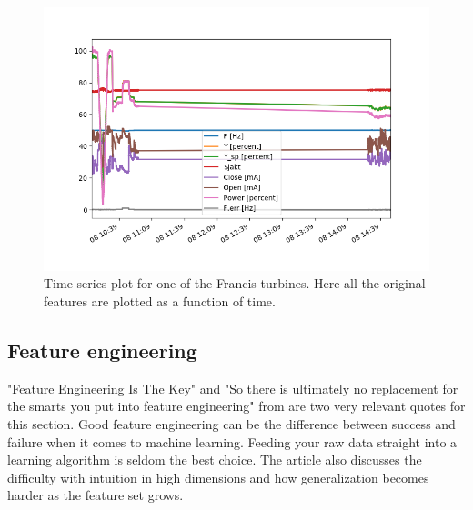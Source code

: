         \begin{figure}
            \centering
            \includegraphics[width=\textwidth]{figures/data/A1_all_timeseries.png}
            \caption{Time series plot for one of the Francis turbines. Here all the original features are plotted as a function of time.}
            \label{fig:timeseries_A2}
        \end{figure}
    
    \subsection{Feature engineering}
        
        "Feature Engineering Is The Key" and "So there is ultimately no replacement for the smarts you put into feature engineering" from \cite{Domingos2012} are two very relevant quotes for this section. Good feature engineering can be the difference between success and failure when it comes to machine learning. Feeding your raw data straight into a learning algorithm is seldom the best choice. The article also discusses the difficulty with intuition in high dimensions and how generalization becomes harder as the feature set grows.     
        
